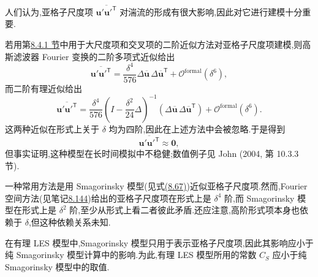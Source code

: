 \begin{note}[亚格子尺度项]
\label{note:les-subgrid-term}
人们认为,亚格子尺度项 $\overline{\bm{u}'\bm{u}'^{\mathsf T}}$ 对湍流的形成有很大影响,因此对它进行建模十分重要.
\end{note}

\begin{note}
\label{note:les-second-order-fourier-sgs-term}
若用第\hyperref[subsec:les-large-cross-term-modeling]{8.4.1 节}中用于大尺度项和交叉项的二阶近似方法对亚格子尺度项建模,则高斯滤波器 Fourier 变换的二阶多项式近似给出
\[
 \overline{\bm{u}'\bm{u}'^{\mathsf T}}
 =\frac{\delta^4}{576}
  \Delta\overline{\bm{u}}\,
  \Delta\overline{\bm{u}}^{\mathsf T}
  +\mathcal{O}^{\mathrm{formal}}(\delta^6),
\]
而二阶有理近似给出
\[
 \overline{\bm{u}'\bm{u}'^{\mathsf T}}
 =\frac{\delta^4}{576}
  \left(I-\frac{\delta^2}{24}\Delta\right)^{-1}
  \left(\Delta\overline{\bm{u}}\,
  \Delta\overline{\bm{u}}^{\mathsf T}\right)
  +\mathcal{O}^{\mathrm{formal}}(\delta^6).
\]
这两种近似在形式上关于 $\delta$ 均为四阶,因此在上述方法中会被忽略.于是得到
\[
 \overline{\bm{u}'\bm{u}'^{\mathsf T}}\approx\bm{0},
\]
但事实证明,这种模型在长时间模拟中不稳健;数值例子见 John (2004, 第 10.3.3 节).
\end{note}

\begin{note}[Smagorinsky 模型]
\label{note:les-smagorinsky-sgs-model}
一种常用方法是用 Smagorinsky 模型(见式\hyperref[eq:smagorinsky-turbulent-viscosity]{(8.67)})近似亚格子尺度项.然而,Fourier 空间方法(见笔记\hyperref[note:les-second-order-fourier-sgs-term]{8.144})给出的亚格子尺度项在形式上是 $\delta^4$ 阶,而 Smagorinsky 模型在形式上是 $\delta^2$ 阶,至少从形式上看二者彼此矛盾.还应注意,高阶形式项本身也依赖于 $\delta$,但这种依赖关系未知.

在有理 LES 模型中,Smagorinsky 模型只用于表示亚格子尺度项,因此其影响应小于纯 Smagorinsky 模型计算中的影响.为此,有理 LES 模型所用的常数 $C_S$ 应小于纯 Smagorinsky 模型中的取值.
\end{note}

